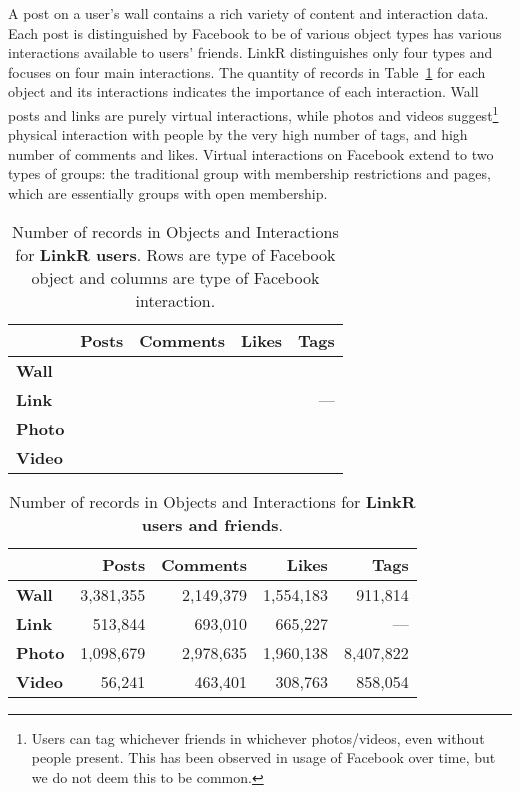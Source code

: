 \documentclass[letterpaper]{article}
\begin{document}
A post on a user's wall contains a rich variety of content and interaction data. Each post is distinguished by Facebook to be of various object types has various interactions available to users' friends. LinkR distinguishes only four types and focuses on four main interactions. The quantity of records in Table~\ref{tab:interactions:users} for each object and its interactions indicates the importance of each interaction. Wall posts and links are purely virtual interactions, while photos and videos suggest\footnote{Users can tag whichever friends in whichever photos/videos, even without people present. This has been observed in usage of Facebook over time, but we do not deem this to be common.} physical interaction with people by the very high number of tags, and high number of comments and likes. Virtual interactions on Facebook extend to two types of groups: the traditional group with membership restrictions and pages, which are essentially groups with open membership.




\begin{table}
\centering
\caption{\small Number of records in Objects and Interactions for \textbf{LinkR users}. Rows are type of Facebook object and columns are type of Facebook interaction.}
\label{tab:interactions:users}
\begin{tabular}{|>{\small}l|>{\small}r|>{\small}r|>{\small}r|>{\small}r|}
\hline
 & \textbf{Posts} & \textbf{Comments} & \textbf{Likes} & \textbf{Tags} \\
\hline
\textbf{Wall} &  &  &  &  \\
\hline
\textbf{Link} &  &  &  & --- \\
\hline
\textbf{Photo} &  &  &  &  \\
\hline
\textbf{Video} &  &  &  &  \\
\hline
\end{tabular}
\end{table}




\begin{table}
\centering
\caption{\small Number of records in Objects and Interactions for \textbf{LinkR users and friends}.}
\label{tab:interactions:usersfriends}
\begin{tabular}{|>{\small}l|>{\small}r|>{\small}r|>{\small}r|>{\small}r|}
\hline
 & \textbf{Posts} & \textbf{Comments} & \textbf{Likes} & \textbf{Tags} \\
\hline
\textbf{Wall} & 3,381,355 & 2,149,379 & 1,554,183 & 911,814 \\
\hline
\textbf{Link} & 513,844 & 693,010 & 665,227 & --- \\
\hline
\textbf{Photo} & 1,098,679 & 2,978,635 & 1,960,138 & 8,407,822 \\
\hline
\textbf{Video} & 56,241 & 463,401 & 308,763 & 858,054 \\
\hline
\end{tabular}
\end{table}
\end{document}
